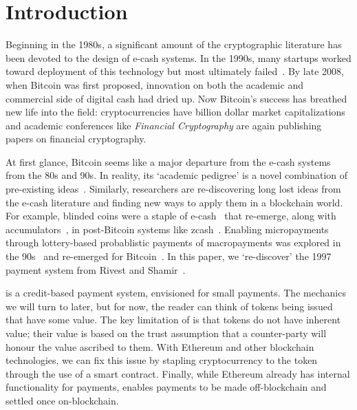 

\section{Introduction}

Beginning in the 1980s, a significant amount of the cryptographic literature has been devoted to the design of e-cash systems. In the 1990s, many startups worked toward deployment of this technology but most ultimately failed~\cite{NBFMG16}. By late 2008, when Bitcoin was first proposed, innovation on both the academic and commercial side of digital cash had dried up. Now Bitcoin's success has breathed new life into the field: cryptocurrencies have billion dollar market capitalizations and academic conferences like \textit{Financial Cryptography} are again publishing papers on financial cryptography. 

At first glance, Bitcoin seems like a major departure from the e-cash systems from the 80s and 90s. In reality, its `academic pedigree' is a novel combination of pre-existing ideas~\cite{NaCl17}. Similarly, researchers are re-discovering long lost ideas from the e-cash literature and finding new ways to apply them in a blockchain world. For example, blinded coins were a staple of e-cash~\cite{Cha82} that re-emerge, along with accumulators~\cite{SaTa99}, in post-Bitcoin systems like zcash~\cite{MGGR13,SCG+14}. Enabling micropayments through lottery-based probablistic payments of macropayments was explored in the 90s~\cite{Riv97,Whe97,JaOd97} and re-emerged for Bitcoin~\cite{Pash15}. In this paper, we `re-discover' the 1997 payment system \pw from Rivest and Shamir~\cite{RS96}. 

\pw is a credit-based payment system, envisioned for small payments. The mechanics we will turn to later, but for now, the reader can think of tokens being issued that have some value. The key limitation of \pw is that tokens do not have inherent value; their value is based on the trust assumption that a counter-party will honour the value ascribed to them. With Ethereum and other blockchain technologies, we can fix this issue by stapling cryptocurrency to the token through the use of a smart contract. Finally, while Ethereum already has internal functionality for payments, \ew enables payments to be made off-blockchain and settled once on-blockchain.


